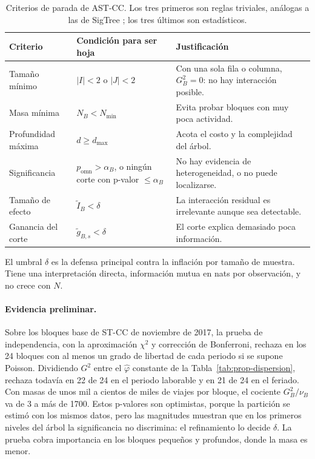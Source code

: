 \begin{table}[t]
\centering
\small
\begin{tabular}{>{\raggedright\arraybackslash}p{}>{\raggedright\arraybackslash}p{}>{\raggedright\arraybackslash}p{}}
\toprule
Criterio & Condición para ser hoja & Justificación \\
\midrule
Tamaño mínimo & $|I|<2$ o $|J|<2$ & Con una sola fila o columna, $G^2_B=0$: no hay interacción posible. \\
Masa mínima & $N_B<N_{\min}$ & Evita probar bloques con muy poca actividad. \\
Profundidad máxima & $d\ge d_{\max}$ & Acota el costo y la complejidad del árbol. \\
Significancia & $p_{\mathrm{omn}}>\alpha_B$, o ningún corte con p-valor $\le\alpha_B$ & No hay evidencia de heterogeneidad, o no puede localizarse. \\
Tamaño de efecto & $\tilde I_B<\delta$ & La interacción residual es irrelevante aunque sea detectable. \\
Ganancia del corte & $\tilde g_{B,s}<\delta$ & El corte explica demasiado poca información. \\
\bottomrule
\end{tabular}
\caption{Criterios de parada de AST-CC. Los tres primeros son reglas triviales,
análogas a las de SigTree \cite{Hu2025}; los tres últimos son estadísticos.}
\label{tab:prop-parada}
\end{table}

El umbral $\delta$ es la defensa principal contra la inflación por tamaño de
muestra. Tiene una interpretación directa, información mutua en nats por
observación, y no crece con $N$.

\paragraph{Evidencia preliminar.} Sobre los bloques base de ST-CC de noviembre
de 2017, la prueba de independencia, con la aproximación $\chi^2$ y corrección
de Bonferroni, rechaza en los 24 bloques con al menos un grado de libertad de
cada periodo si se supone Poisson. Dividiendo $G^2$ entre el $\hat\varphi$
constante de la Tabla~\ref{tab:prop-dispersion}, rechaza todavía en 22 de 24 en
el periodo laborable y en 21 de 24 en el feriado. Con masas de unos mil a cientos
de miles de viajes por bloque, el cociente $G^2_B/\nu_B$ va de 3 a más de 1700.
Estos p-valores son optimistas, porque la partición se estimó con los mismos
datos, pero las magnitudes muestran que en los primeros niveles del árbol la
significancia no discrimina: el refinamiento lo decide $\delta$. La prueba
cobra importancia en los bloques pequeños y profundos, donde la masa es menor.

